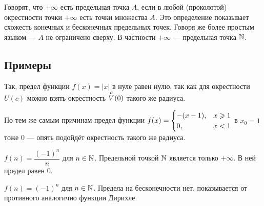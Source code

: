 \documentclass[a4paper]{report}
\begin{document}
    Говорят, что $+\infty$ есть предельная точка $A$, если в любой (проколотой) окрестности точки $+\infty$ есть точки множества $A$.
    Это определение показывает схожесть конечных и бесконечных предельных точек.
    Говоря же более простым языком --- $A$ не ограничено сверху.
    В частности $+\infty $ --- предельная точка $\N$.


    \subsection{Примеры}
    Так, предел функции $f(x) = |x|$ в нуле равен нулю, так как для окрестности $U(c)$ можно взять окрестность $\neighborhood[]{0}$ такого же радиуса.

    По тем же самым причинам предел функции $f(x) = \switch{-(x - 1),&x \ge 1\\ 0,&x < 1}$ в $x_0 = 1$ тоже $0$ --- опять подойдёт окрестность такого же радиуса.


    $f(n) = \dfrac{(-1)^n}{n}$ для $n \in \N$.
    Предельной точкой $\N$ является только $+\infty$.
    В ней предел равен $0$. 

    $f(n) = (-1)^n$ для $n \in \N$.
    Предела на бесконечности нет, показывается от противного аналогично функции Дирихле.
\end{document}
